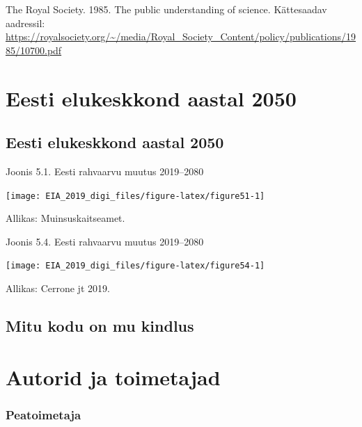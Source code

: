 \documentclass[estonian,]{article}
\begin{document}
The Royal Society. 1985. The public understanding of science. Kättesaadav aadressil: \url{https://royalsociety.org/~/media/Royal_Society_Content/policy/publications/1985/10700.pdf}

\hypertarget{eesti-elukeskkond-aastal-2050}{%
\section{Eesti elukeskkond aastal 2050}\label{eesti-elukeskkond-aastal-2050}}

\hypertarget{eesti-elukeskkond-aastal-2050-1}{%
\subsection*{Eesti elukeskkond aastal 2050}\label{eesti-elukeskkond-aastal-2050-1}}

{Joonis 5.1.} Eesti rahvaarvu muutus 2019--2080

\begin{center}\texttt{[image: EIA\_2019\_digi\_files/figure-latex/figure51-1]} \end{center}

\begin{imgsource}
{Allikas:} Muinsuskaitseamet.
\end{imgsource}

{Joonis 5.4.} Eesti rahvaarvu muutus 2019--2080

\begin{center}\texttt{[image: EIA\_2019\_digi\_files/figure-latex/figure54-1]} \end{center}

\begin{imgsource}
{Allikas:} Cerrone jt 2019.
\end{imgsource}

\hypertarget{mitu-kodu-on-mu-kindlus}{%
\subsection{Mitu kodu on mu kindlus}\label{mitu-kodu-on-mu-kindlus}}

\hypertarget{autorid-ja-toimetajad}{%
\section{Autorid ja toimetajad}\label{autorid-ja-toimetajad}}

\hypertarget{peatoimetaja}{%
\subsubsection*{Peatoimetaja}\label{peatoimetaja}}
\end{document}
